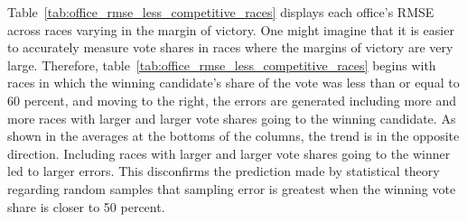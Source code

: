 \documentclass[12pt]{article}
\begin{document}
Table~\ref{tab:office_rmse_less_competitive_races} displays each office's RMSE across races varying in the margin of victory. One might imagine that it is easier to accurately measure vote shares in races where the margins of victory are very large. Therefore, table~\ref{tab:office_rmse_less_competitive_races} begins with races in which the winning candidate's share of the vote was less than or equal to 60 percent, and moving to the right, the errors are generated including more and more races with larger and larger vote shares going to the winning candidate. As shown in the averages at the bottoms of the columns, the trend is in the opposite direction. Including races with larger and larger vote shares going to the winner led to larger errors. This disconfirms the prediction made by statistical theory regarding random samples that sampling error is greatest when the winning vote share is closer to 50 percent.





\end{document}
